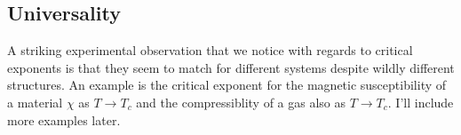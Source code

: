 \subsection{Universality} 
A striking experimental observation that we notice with regards to critical exponents is that they seem to match for different systems despite wildly different structures. An example is the critical exponent for the magnetic susceptibility of a material $\chi$ as $T \rightarrow T_c$ and the compressiblity of a gas also as $T \rightarrow T_c$. I'll include more examples later. 

